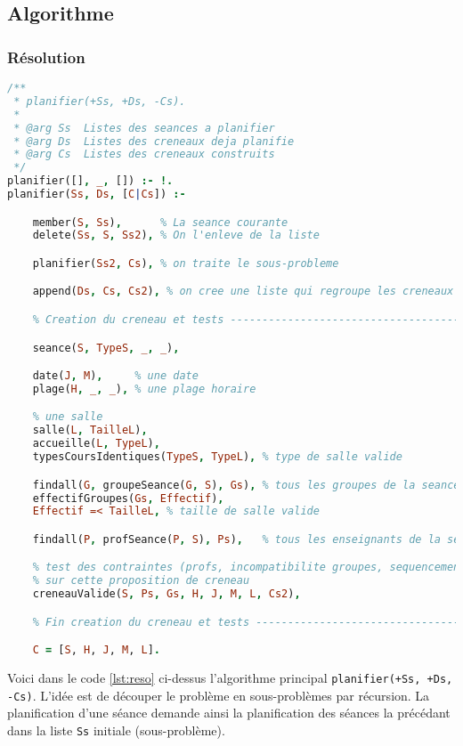 
\subsection{Algorithme}

\subsubsection{Résolution}

\begin{lstlisting}[language=Prolog, caption=Resolution, captionpos=b,
label={lst:reso}]
/**
 * planifier(+Ss, +Ds, -Cs).
 *
 * @arg Ss  Listes des seances a planifier
 * @arg Ds  Listes des creneaux deja planifie
 * @arg Cs  Listes des creneaux construits
 */
planifier([], _, []) :- !.
planifier(Ss, Ds, [C|Cs]) :-

    member(S, Ss),      % La seance courante
    delete(Ss, S, Ss2), % On l'enleve de la liste

    planifier(Ss2, Cs), % on traite le sous-probleme

    append(Ds, Cs, Cs2), % on cree une liste qui regroupe les creneaux existants

    % Creation du creneau et tests ---------------------------------------------

    seance(S, TypeS, _, _),

    date(J, M),     % une date
    plage(H, _, _), % une plage horaire

    % une salle
    salle(L, TailleL),
    accueille(L, TypeL),
    typesCoursIdentiques(TypeS, TypeL), % type de salle valide

    findall(G, groupeSeance(G, S), Gs), % tous les groupes de la seance
    effectifGroupes(Gs, Effectif),
    Effectif =< TailleL, % taille de salle valide

    findall(P, profSeance(P, S), Ps),   % tous les enseignants de la seance

    % test des contraintes (profs, incompatibilite groupes, sequencement)
    % sur cette proposition de creneau
    creneauValide(S, Ps, Gs, H, J, M, L, Cs2),

    % Fin creation du creneau et tests -----------------------------------------

    C = [S, H, J, M, L].
\end{lstlisting}

Voici dans le code \ref{lst:reso} ci-dessus l'algorithme principal
\texttt{planifier(+Ss, +Ds, -Cs)}.
L'idée est de découper le problème en sous-problèmes par récursion. La
planification d'une séance demande ainsi la planification des séances la
précédant dans la liste \texttt{Ss} initiale (sous-problème).

